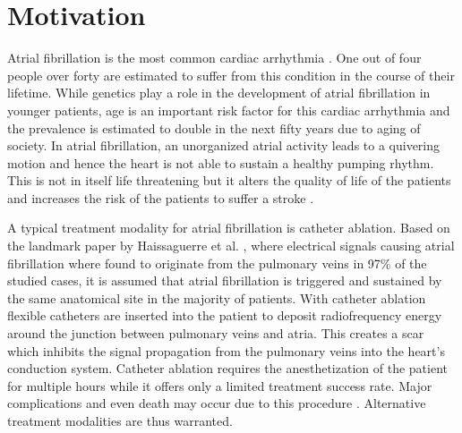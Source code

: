 % 
% 
% 
% 


\chapter*{Motivation}

Atrial fibrillation is the most common cardiac arrhythmia \cite{ESC10, CE09}. One out of four people over forty are estimated to 
suffer from this condition in the course of their lifetime. While genetics play a role in the development of atrial fibrillation in younger 
patients, age is an important risk factor for this cardiac arrhythmia and the 
prevalence is estimated to double in the next fifty years due to aging of society. In atrial fibrillation, an unorganized atrial activity 
leads to a quivering motion and hence the heart is not able to sustain a healthy pumping rhythm. This is not in itself life threatening but 
it alters the quality of life of the patients and increases the risk of the patients to suffer a stroke \cite{Ben98, Wol91}.\newline

A typical treatment modality for atrial fibrillation is catheter ablation. Based on the landmark paper by Haissaguerre et al. \cite{Hai98}, where 
electrical signals causing atrial fibrillation where found to originate from the pulmonary veins in 97\% of the studied cases, it is assumed 
that atrial fibrillation is triggered and sustained by the same anatomical site in the majority of patients. With catheter ablation flexible 
catheters are inserted into the patient to deposit radiofrequency energy around the junction between pulmonary veins and atria. This creates a 
scar which inhibits the signal propagation from the pulmonary veins into the heart's conduction system. Catheter ablation requires the 
anesthetization of the patient for multiple hours while it offers only a limited treatment success rate. Major complications and even death 
may occur due to this procedure \cite{Cap05, Cap10}. Alternative treatment modalities are thus warranted.\newline

